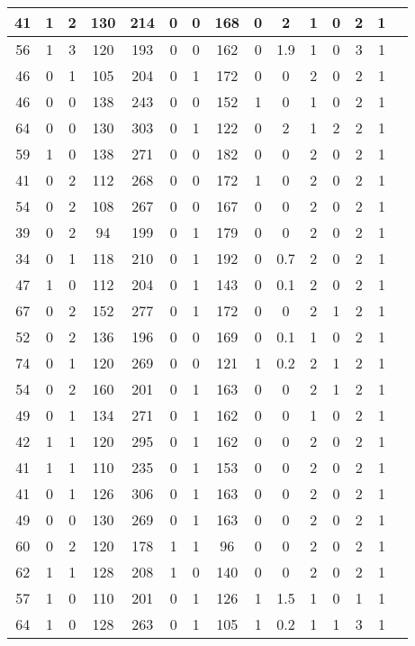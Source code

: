 \documentclass{article}
\begin{document}
\begin{longtable}{
|
c|c|c|c|c|c|c|c|c|c|c|c|c|c|c|}
\hline
41 & 1 & 2 & 130 & 214 & 0 & 0 & 168 & 0 & 2 & 1 & 0 & 2 & 1 \\
\hline
56 & 1 & 3 & 120 & 193 & 0 & 0 & 162 & 0 & 1.9 & 1 & 0 & 3 & 1 \\
\hline
46 & 0 & 1 & 105 & 204 & 0 & 1 & 172 & 0 & 0 & 2 & 0 & 2 & 1 \\
\hline
46 & 0 & 0 & 138 & 243 & 0 & 0 & 152 & 1 & 0 & 1 & 0 & 2 & 1 \\
\hline
64 & 0 & 0 & 130 & 303 & 0 & 1 & 122 & 0 & 2 & 1 & 2 & 2 & 1 \\
\hline
59 & 1 & 0 & 138 & 271 & 0 & 0 & 182 & 0 & 0 & 2 & 0 & 2 & 1 \\
\hline
41 & 0 & 2 & 112 & 268 & 0 & 0 & 172 & 1 & 0 & 2 & 0 & 2 & 1 \\
\hline
54 & 0 & 2 & 108 & 267 & 0 & 0 & 167 & 0 & 0 & 2 & 0 & 2 & 1 \\
\hline
39 & 0 & 2 & 94 & 199 & 0 & 1 & 179 & 0 & 0 & 2 & 0 & 2 & 1 \\
\hline
34 & 0 & 1 & 118 & 210 & 0 & 1 & 192 & 0 & 0.7 & 2 & 0 & 2 & 1 \\
\hline
47 & 1 & 0 & 112 & 204 & 0 & 1 & 143 & 0 & 0.1 & 2 & 0 & 2 & 1 \\
\hline
67 & 0 & 2 & 152 & 277 & 0 & 1 & 172 & 0 & 0 & 2 & 1 & 2 & 1 \\
\hline
52 & 0 & 2 & 136 & 196 & 0 & 0 & 169 & 0 & 0.1 & 1 & 0 & 2 & 1 \\
\hline
74 & 0 & 1 & 120 & 269 & 0 & 0 & 121 & 1 & 0.2 & 2 & 1 & 2 & 1 \\
\hline
54 & 0 & 2 & 160 & 201 & 0 & 1 & 163 & 0 & 0 & 2 & 1 & 2 & 1 \\
\hline
49 & 0 & 1 & 134 & 271 & 0 & 1 & 162 & 0 & 0 & 1 & 0 & 2 & 1 \\
\hline
42 & 1 & 1 & 120 & 295 & 0 & 1 & 162 & 0 & 0 & 2 & 0 & 2 & 1 \\
\hline
41 & 1 & 1 & 110 & 235 & 0 & 1 & 153 & 0 & 0 & 2 & 0 & 2 & 1 \\
\hline
41 & 0 & 1 & 126 & 306 & 0 & 1 & 163 & 0 & 0 & 2 & 0 & 2 & 1 \\
\hline
49 & 0 & 0 & 130 & 269 & 0 & 1 & 163 & 0 & 0 & 2 & 0 & 2 & 1 \\
\hline
60 & 0 & 2 & 120 & 178 & 1 & 1 & 96 & 0 & 0 & 2 & 0 & 2 & 1 \\
\hline
62 & 1 & 1 & 128 & 208 & 1 & 0 & 140 & 0 & 0 & 2 & 0 & 2 & 1 \\
\hline
57 & 1 & 0 & 110 & 201 & 0 & 1 & 126 & 1 & 1.5 & 1 & 0 & 1 & 1 \\
\hline
64 & 1 & 0 & 128 & 263 & 0 & 1 & 105 & 1 & 0.2 & 1 & 1 & 3 & 1 \\

\end{longtable}
\end{document}
